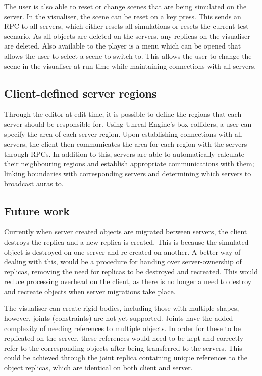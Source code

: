 The user is also able to reset or change scenes that are being simulated on the server. In the visualiser, the scene can be reset on a key press. This sends an RPC to all servers, which either resets all simulations or resets the current test scenario. As all objects are deleted on the servers, any replicas on the visualiser are deleted. Also available to the player is a menu which can be opened that allows the user to select a scene to switch to. This allows the user to change the scene in the visualiser at run-time while maintaining connections with all servers.


\subsection{Client-defined server regions}
Through the editor at edit-time, it is possible to define the regions that each server should be responsible for. Using Unreal Engine's box colliders, a user can specify the area of each server region. Upon establishing connections with all servers, the client then communicates the area for each region with the servers through RPCs. In addition to this, servers are able to automatically calculate their neighbouring regions and establish appropriate communications with them; linking boundaries with corresponding servers and determining which servers to broadcast auras to.


\subsection{Future work}
Currently when server created objects are migrated between servers, the client destroys the replica and a new replica is created. This is because the simulated object is destroyed on one server and re-created on another. A better way of dealing with this, would be a procedure for handing over server-ownership of replicas, removing the need for replicas to be destroyed and recreated. This would reduce processing overhead on the client, as there is no longer a need to destroy and recreate objects when server migrations take place.

The visualiser can create rigid-bodies, including those with multiple shapes, however, joints (constraints) are not yet supported. Joints have the added complexity of needing references to multiple objects. In order for these to be replicated on the server, these references would need to be kept and correctly refer to the corresponding objects after being transferred to the servers. This could be achieved through the joint replica containing unique references to the object replicas, which are identical on both client and server.

